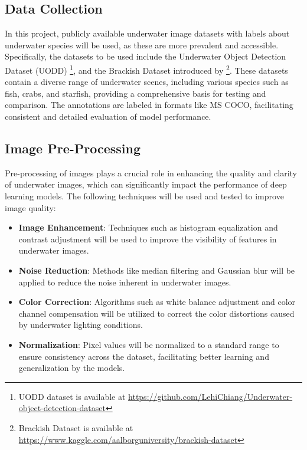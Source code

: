 \subsection{Data Collection}

In this project, publicly available underwater image datasets with labels about
underwater species will be used, as these are more prevalent and accessible.
Specifically, the datasets to be used include the Underwater Object Detection Dataset (UODD)
\parencite{jiangUnderwaterSpeciesDetection2021}\footnote{UODD dataset is available at \url{https://github.com/LehiChiang/Underwater-object-detection-dataset}},
and the Brackish Dataset introduced by \Textcite{pedersenDetectionMarineAnimals2019}
\footnote{Brackish Dataset is available at \url{https://www.kaggle.com/aalborguniversity/brackish-dataset}}.
These datasets contain a diverse range of underwater scenes,
including various species such as fish, crabs, and starfish,
providing a comprehensive basis for testing and comparison. The annotations are labeled
in formats like MS COCO, facilitating consistent and detailed evaluation of model performance.

\subsection{Image Pre-Processing}

Pre-processing of images plays a crucial role in enhancing the quality and clarity of underwater images,
which can significantly impact the performance of deep learning models.
The following techniques will be used and tested to improve image quality:

\begin{itemize}
    \item \textbf{Image Enhancement}: Techniques such as histogram equalization and contrast adjustment will be used to improve the visibility of features in underwater images.
    \item \textbf{Noise Reduction}: Methods like median filtering and Gaussian blur will be applied to reduce the noise inherent in underwater images.
    \item \textbf{Color Correction}: Algorithms such as white balance adjustment and color channel compensation will be utilized to correct the color distortions caused by underwater lighting conditions.
    \item \textbf{Normalization}: Pixel values will be normalized to a standard range to ensure consistency across the dataset, facilitating better learning and generalization by the models.
\end{itemize}

